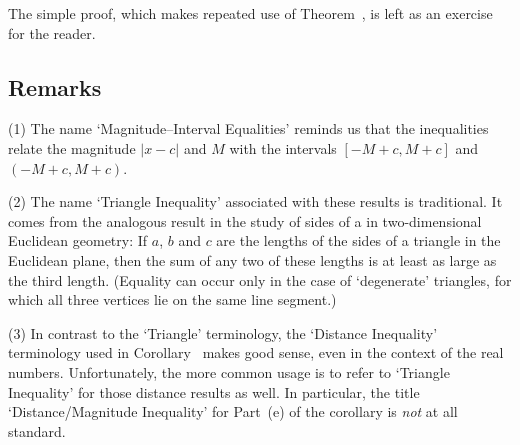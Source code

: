 {\V

        The simple proof, which makes repeated use of Theorem~, is left as an exercise for the reader.


\V
\V

            \subsection{\small{\bf Remarks}}
            \label{RemrkB20.67}
\V

        \hspace*{\parindent}(1) The name `Magnitude--Interval Equalities' reminds us that the inequalities relate the magnitude $|x-c|$ and $M$ with the intervals $[-M+c,M+c]$ and $(-M+c,M+c)$.

\V

        (2) The name `Triangle Inequality' associated with these results is traditional.
    It comes from the analogous result in the study of sides of a in two-dimensional Euclidean geometry:
    If $a$, $b$ and $c$ are the lengths of the sides of a triangle in the Euclidean plane,
    then the sum of any two of these lengths is at least as large as the third length.
    (Equality can occur only in the case of `degenerate' triangles, for which all three vertices lie on the same line segment.)

\V

        (3) In contrast to the `Triangle' terminology, the `Distance Inequality' terminology used in Corollary~ makes good sense,
    even in the context of the real numbers.
    Unfortunately, the more common usage is to refer to `Triangle Inequality' for those distance results as well.
    In particular, the title `Distance/Magnitude Inequality' for Part~(e) of the corollary is {\em not} at all standard.

}%
